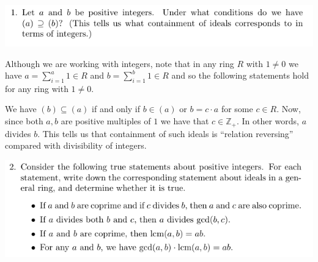 \documentclass[12pt,letterpaper,boxed]{hmcpset}
\newcommand{\Z}{\mathbb Z}
\begin{document}


\begin{problem}
	\includegraphics[scale=0.8]{1.png}
	\hfill
\end{problem}

\begin{solution}
Although we are working with integers, note that in any ring $R$ with
$1\neq 0$ we have $a = \sum_{i=1}^a 1 \in R$ and $b = \sum_{i=1}^b 1
\in R$ and so the following statements hold for any ring with $1 \neq
0$. 

We have $(b) \subseteq (a)$ if and only if $b \in (a)$ or $b = c\cdot
a$ for some $c \in R$. Now, since both $a,b$ are positive multiples of $1$ we
have that $c \in \Z_+$. In other words, $a$ divides $b$. This tells us
that containment of such ideals is ``relation reversing'' compared with
divisibility of integers.
\end{solution}

\newpage


\begin{problem}
	\includegraphics[scale=0.8]{2.png}
	\hfill
\end{problem}
\end{document}
